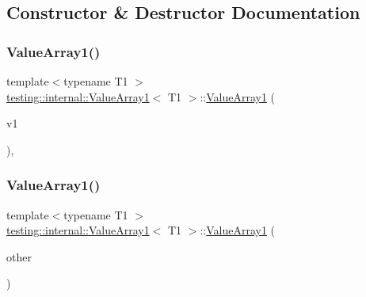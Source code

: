\subsection{Constructor \& Destructor Documentation}
\mbox{\label{classtesting_1_1internal_1_1_value_array1_a8eaffed25a4ddbe790472ca07595a319}} 
\subsubsection{\texorpdfstring{ValueArray1()}{ValueArray1()}\hspace{0.1cm}{\footnotesize\ttfamily [1/2]}}
{\footnotesize\ttfamily template$<$typename T1 $>$ \\
\mbox{\hyperlink{classtesting_1_1internal_1_1_value_array1}{testing\+::internal\+::\+Value\+Array1}}$<$ T1 $>$\+::\mbox{\hyperlink{classtesting_1_1internal_1_1_value_array1}{Value\+Array1}} (\begin{DoxyParamCaption}\item[{T1}]{v1 }\end{DoxyParamCaption})\hspace{0.3cm}{\ttfamily [inline]}, {\ttfamily [explicit]}}

\mbox{\label{classtesting_1_1internal_1_1_value_array1_a54a3968da3354334cb4d730f5254e216}} 
\subsubsection{\texorpdfstring{ValueArray1()}{ValueArray1()}\hspace{0.1cm}{\footnotesize\ttfamily [2/2]}}
{\footnotesize\ttfamily template$<$typename T1 $>$ \\
\mbox{\hyperlink{classtesting_1_1internal_1_1_value_array1}{testing\+::internal\+::\+Value\+Array1}}$<$ T1 $>$\+::\mbox{\hyperlink{classtesting_1_1internal_1_1_value_array1}{Value\+Array1}} (\begin{DoxyParamCaption}\item[{const \mbox{\hyperlink{classtesting_1_1internal_1_1_value_array1}{Value\+Array1}}$<$ T1 $>$ \&}]{other }\end{DoxyParamCaption})\hspace{0.3cm}{\ttfamily [inline]}}



